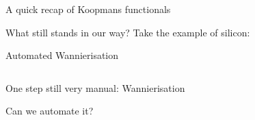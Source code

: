 \documentclass[xcolor=table,aspectratio=169]{beamer}
\numberwithin{equation}{section}
\begin{document}
\begin{frame}{A quick recap of Koopmans functionals}

   What still stands in our way? Take the example of silicon:


\end{frame}
% 
\begin{frame}{Automated Wannierisation}

   \begin{columns}
      \begin{column}{0.5\textwidth}
         One step still very manual: Wannierisation

         Can we automate it?


\end{column}
\end{columns}
\end{frame}
\end{document}
